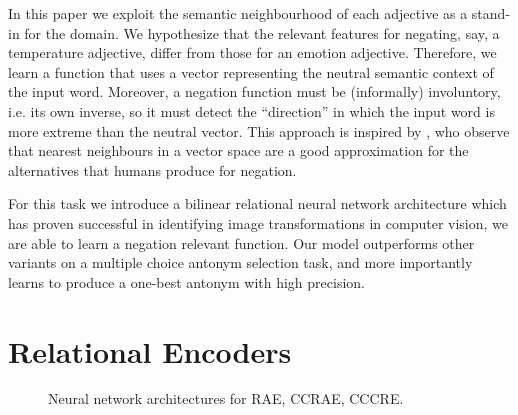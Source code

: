 \documentclass[11pt]{article}
\begin{document}
In this paper we exploit the semantic neighbourhood of each adjective
as a stand-in for the domain. We hypothesize that the relevant
features for negating, say, a temperature adjective, differ from those
for an emotion adjective. Therefore, we learn a function that uses a
vector representing the neutral semantic context of the input
word. Moreover, a negation function must be (informally) involuntory,
i.e. its own inverse, so it must detect the ``direction'' in which the
input word is more extreme than the neutral vector. This approach is inspired by \citet{kruszewski:16},
 who observe that nearest neighbours in a vector space are a good approximation for the 
alternatives that humans produce for negation.

For this task we introduce a bilinear relational neural network architecture which has proven successful in 
identifying image transformations in computer vision, we are able to learn a
negation relevant function. Our model outperforms other variants on a
multiple choice antonym selection task, and more importantly learns to produce a
one-best antonym with high precision.


\section{Relational Encoders}

\begin{figure}[h!t]
\centering
{}
\label{f:arch}
\caption{Neural network architectures for RAE, CCRAE, CCCRE.}
\end{figure}
\end{document}
